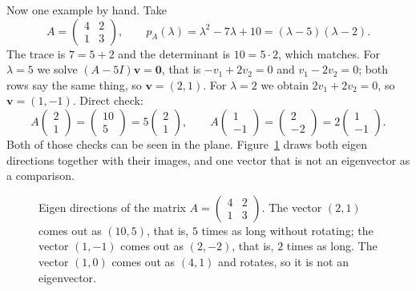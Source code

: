 Now one example by hand. Take
\[
  A=\begin{pmatrix}4&2\\ 1&3\end{pmatrix},\qquad
  p_{A}(\lambda)=\lambda^{2}-7\lambda+10=(\lambda-5)(\lambda-2).
\]
The trace is $7=5+2$ and the determinant is $10=5\cdot2$, which matches. For $\lambda=5$ we solve
$(A-5I)\mathbf{v}=\mathbf{0}$, that is $-v_{1}+2v_{2}=0$ and $v_{1}-2v_{2}=0$; both rows say the
same thing, so $\mathbf{v}=(2,1)$. For $\lambda=2$ we obtain $2v_{1}+2v_{2}=0$, so
$\mathbf{v}=(1,-1)$. Direct check:
\[
  A\begin{pmatrix}2\\ 1\end{pmatrix}=\begin{pmatrix}10\\ 5\end{pmatrix}=5
  \begin{pmatrix}2\\ 1\end{pmatrix},\qquad
  A\begin{pmatrix}1\\ -1\end{pmatrix}=\begin{pmatrix}2\\ -2\end{pmatrix}=2
  \begin{pmatrix}1\\ -1\end{pmatrix}.
\]
Both of those checks can be seen in the plane. Figure~\ref{fig:panah-eigen} draws both eigen
directions together with their images, and one vector that is not an eigenvector as a comparison.

\begin{figure}[htbp]
\centering
{}
\caption{Eigen directions of the matrix $A=\begin{pmatrix}4&2\\1&3\end{pmatrix}$. The vector
$(2,1)$ comes out as $(10,5)$, that is, $5$ times as long without rotating; the vector $(1,-1)$
comes out as $(2,-2)$, that is, $2$ times as long. The vector $(1,0)$ comes out as $(4,1)$ and
rotates, so it is not an eigenvector.}
\label{fig:panah-eigen}
\end{figure}

